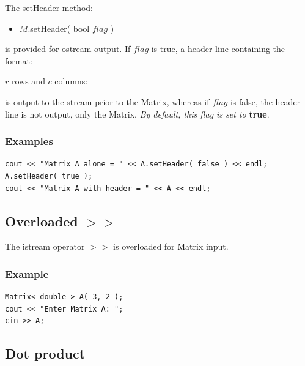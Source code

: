 \documentclass{report}
\begin{document}
The setHeader method:

\begin{itemize}
\item $M$.setHeader( bool $flag$ )
\end{itemize}

is provided for ostream output.  If $flag$ is true, a header line
containing the format:
\begin{center}
$r$ rows and $c$ columns:
\end{center}
is output to the stream prior to the Matrix, whereas if $flag$ is
false, the header line is not output, only the Matrix.  {\em By
default, this flag is set to} {\bf true}.

\subsubsection{Examples}

\begin{verbatim}
cout << "Matrix A alone = " << A.setHeader( false ) << endl;
A.setHeader( true );
cout << "Matrix A with header = " << A << endl;
\end{verbatim}

\subsection{Overloaded $>>$}

The istream operator $>>$ is overloaded for Matrix input.

\subsubsection{Example}

\begin{verbatim}
Matrix< double > A( 3, 2 );
cout << "Enter Matrix A: ";
cin >> A;
\end{verbatim}

\subsection{Dot product}
\end{document}
